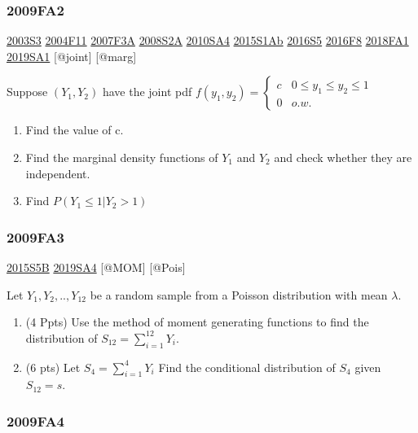\documentclass[6pt,twocolumn,Portrait]{article}
\begin{document}
\hypertarget{fa2}{%
\subsubsection{2009FA2}\label{fa2}}

\protect\hyperlink{s3}{2003S3} \protect\hyperlink{f11}{2004F11}
\protect\hyperlink{f3a}{2007F3A} \protect\hyperlink{s2a}{2008S2A}
\protect\hyperlink{sa4-1}{2010SA4} \protect\hyperlink{s1ab}{2015S1Ab}
\protect\hyperlink{s5-4}{2016S5} \protect\hyperlink{f8-4}{2016F8}
\protect\hyperlink{fa1-4}{2018FA1} \protect\hyperlink{sa1-3}{2019SA1}
{[}@joint{]} {[}@marg{]}

Suppose \((Y_1,Y_2)\) have the joint pdf
\(f(y_1,y_2)=\begin{cases}c&0\le y_1\le y_2\le 1\\0& o.w.\end{cases}\)

\begin{enumerate}
\def\labelenumi{(\alph{enumi})}
\item
  Find the value of c.
\item
  Find the marginal density functions of \(Y_1\) and \(Y_2\) and check
  whether they are independent.
\item
  Find \(P(Y_1\le1|Y_2>1)\)
\end{enumerate}

\hypertarget{fa3}{%
\subsubsection{2009FA3}\label{fa3}}

\protect\hyperlink{s5b-1}{2015S5B} \protect\hyperlink{sa4-3}{2019SA4}
{[}@MOM{]} {[}@Pois{]}

Let \(Y_1,Y_2,..,Y_{12}\) be a random sample from a Poisson distribution
with mean \(\lambda\).

\begin{enumerate}
\def\labelenumi{(\alph{enumi})}
\item
  (4 Ppts) Use the method of moment generating functions to find the
  distribution of \(S_{12}=\sum^{12}_{i=1} Y_i\).
\item
  (6 pts) Let \(S_4=\sum_{i=1}^4Y_i\) Find the conditional distribution
  of \(S_4\) given \(S_{12}=s\).
\end{enumerate}

\hypertarget{fa4}{%
\subsubsection{2009FA4}\label{fa4}}
\end{document}
